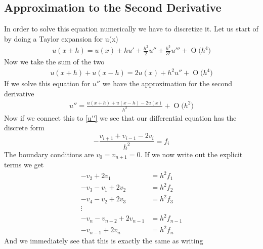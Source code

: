 \documentclass[12pt]{article}
\numberwithin{equation}{section}     %
\newcommand{\BigO}[1]{\ensuremath{\operatorname{O}\bigl(#1\bigr)}}
\begin{document}
\subsection{Approximation to the Second Derivative}
In order to solve this equation numerically we have to discretize it. Let us start of by doing a Taylor expansion for u(x)
\begin{align*}
    u(x\pm h)=u(x)\pm hu'+\frac{h^{2}}{2}u''\pm \frac{h^{3}}{3!}u'''+\BigO{h^{4}}
\end{align*}
Now we take the sum of the two
\begin{align*}
    u(x+h)+u(x-h)=2u(x)+h^{2}u''+\BigO{h^{4}}
\end{align*}
If we solve this equation for $u''$ we have the approximation for the second derivative
\begin{align*}
    u''=\frac{u(x+h)+u(x-h)-2u(x)}{h^{2}}+\BigO{h^{2}}
\end{align*}
Now if we connect this to \eqref{u''} we see that our differential equation has the discrete form
\begin{equation}
    -\frac{v_{i+1}+v_{i-1}-2v_{i}}{h^{2}}=f_{i}
\end{equation}
The boundary conditions are $v_{0}=v_{n+1}=0.$ If we now write out the explicit terms we get
\begin{align*}
    -v_{2}+2v_{1}&=h^{2}f_{1}\\
    -v_{3}-v_{1}+2v_{2}&=h^{2}f_{2}\\
    -v_{4}-v_{2}+2v_{3}&=h^{2}f_{3}\\
    \vdots\\
    -v_{n}-v_{n-2}+2v_{n-1}&=h^{2}f_{n-1}\\
    -v_{n-1}+2v_{n}&=h^{2}f_{n}
\end{align*}
And we immediately see that this is exactly the same as writing\\\\
\end{document}
